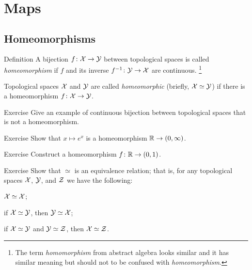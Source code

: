 \chapter{Maps}



\section{Homeomorphisms}

\begin{thm}{Definition}\label{def:homeo}
A bijection $f\colon\mathcal{X}\to\mathcal{Y}$ between topological spaces 
is called \emph{homeomorphism} if $f$ and its inverse $f^{-1}\colon\mathcal{Y}\to\mathcal{X}$
are continuous.%
\footnote{The term \emph{homomorphism} from abstract algebra looks similar and it has similar meaning but should not to be confused with \emph{homeomorphism}.}

Topological spaces $\mathcal{X}$ and $\mathcal{Y}$ are called \emph{homeomorphic} (briefly, $\mathcal{X}\simeq\mathcal{Y}$) if there is a homeomorphism $f\colon\mathcal{X}\to\mathcal{Y}$.
\end{thm}


\begin{thm}{Exercise}\label{ex:bijection-ne-homeo}
Give an example of continuous bijection between topological spaces that is not a homeomorphism.
\end{thm}

\begin{thm}{Exercise}\label{ex:exp}
Show that $x\mapsto e^x$ is a homeomorphism $\mathbb{R}\to (0,\infty)$.
\end{thm}

\begin{thm}{Exercise}\label{ex:arctan}
Construct a homeomorphism $f\colon\mathbb{R}\to (0,1)$.
\end{thm}

\begin{thm}{Exercise}\label{ex:homeo=eq}
Show that $\simeq$ is an equivalence relation;
that is, for any topological spaces $\mathcal{X}$, $\mathcal{Y}$, and $\mathcal{Z}$ we have the following:
\begin{subthm}{}
$\mathcal{X}\simeq\mathcal{X}$;
\end{subthm}

\begin{subthm}{}
if $\mathcal{X}\simeq\mathcal{Y}$, then $\mathcal{Y}\simeq\mathcal{X}$;
\end{subthm}

\begin{subthm}{}
if $\mathcal{X}\simeq\mathcal{Y}$ and $\mathcal{Y}\simeq\mathcal{Z}$, then $\mathcal{X}\simeq\mathcal{Z}$.
\end{subthm}

\end{thm}

